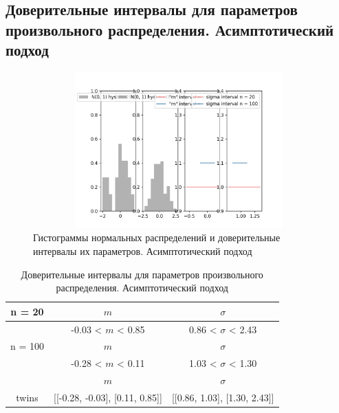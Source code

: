 \documentclass[main.tex]{subfiles}
\begin{document}
\FloatBarrier
\subsection{Доверительные интервалы для параметров произвольного распределения. Асимптотический подход}
\begin{figure}[ht]
	\centering
	\includegraphics[width = 18cm, height = 6cm]{../images/interval/8_2.png}
	\caption{Гистограммы нормальных распределений и доверительные интервалы их параметров. Асимптотический подход}
	\label{w_pert2}
\end{figure}

\begin{table}[ht]
	\centering
	\begin{tabular}{| c | c | c |}
		\hline
		n = 20   &  $m$  & $\sigma$\\ \hline
		&  -0.03 < $m$ < 0.85 & 0.86 < $\sigma$ < 2.43 \\ \hline
		n = 100   &  $m$  & $\sigma$\\ \hline
		& -0.28 < $m$ < 0.11 & 1.03 < $\sigma$ < 1.30 \\ \hline
		&  $m$ & $\sigma$\\ \hline
		twins & [[-0.28, -0.03], [0.11, 0.85]] & [[0.86, 1.03], [1.30, 2.43]] \\
		\hline
	\end{tabular}
	\caption{Доверительные интервалы для параметров произвольного распределения. Асимптотический подход}
	\label{tab:interv_asimpt}
\end{table}

\newpage
\end{document}
